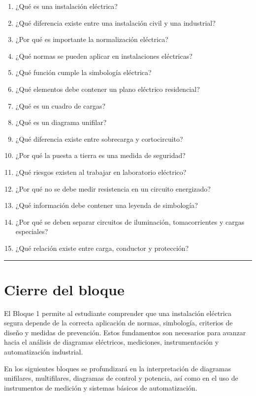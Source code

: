 \documentclass[
  spanish,
  letterpaper,
  DIV=11,
  numbers=noendperiod]{scrreprt}
\providecommand{\tightlist}{%
  \setlength{\itemsep}{0pt}\setlength{\parskip}{0pt}}
\begin{document}
\begin{enumerate}
\def\labelenumi{\arabic{enumi}.}
\tightlist
\item
  ¿Qué es una instalación eléctrica?
\item
  ¿Qué diferencia existe entre una instalación civil y una industrial?
\item
  ¿Por qué es importante la normalización eléctrica?
\item
  ¿Qué normas se pueden aplicar en instalaciones eléctricas?
\item
  ¿Qué función cumple la simbología eléctrica?
\item
  ¿Qué elementos debe contener un plano eléctrico residencial?
\item
  ¿Qué es un cuadro de cargas?
\item
  ¿Qué es un diagrama unifilar?
\item
  ¿Qué diferencia existe entre sobrecarga y cortocircuito?
\item
  ¿Por qué la puesta a tierra es una medida de seguridad?
\item
  ¿Qué riesgos existen al trabajar en laboratorio eléctrico?
\item
  ¿Por qué no se debe medir resistencia en un circuito energizado?
\item
  ¿Qué información debe contener una leyenda de simbología?
\item
  ¿Por qué se deben separar circuitos de iluminación, tomacorrientes y
  cargas especiales?
\item
  ¿Qué relación existe entre carga, conductor y protección?
\end{enumerate}

\begin{center}\rule{0.5\linewidth}{0.5pt}\end{center}

\section{Cierre del bloque}\label{cierre-del-bloque}

El Bloque 1 permite al estudiante comprender que una instalación
eléctrica segura depende de la correcta aplicación de normas,
simbología, criterios de diseño y medidas de prevención. Estos
fundamentos son necesarios para avanzar hacia el análisis de diagramas
eléctricos, mediciones, instrumentación y automatización industrial.

En los siguientes bloques se profundizará en la interpretación de
diagramas unifilares, multifilares, diagramas de control y potencia, así
como en el uso de instrumentos de medición y sistemas básicos de
automatización.
\end{document}
